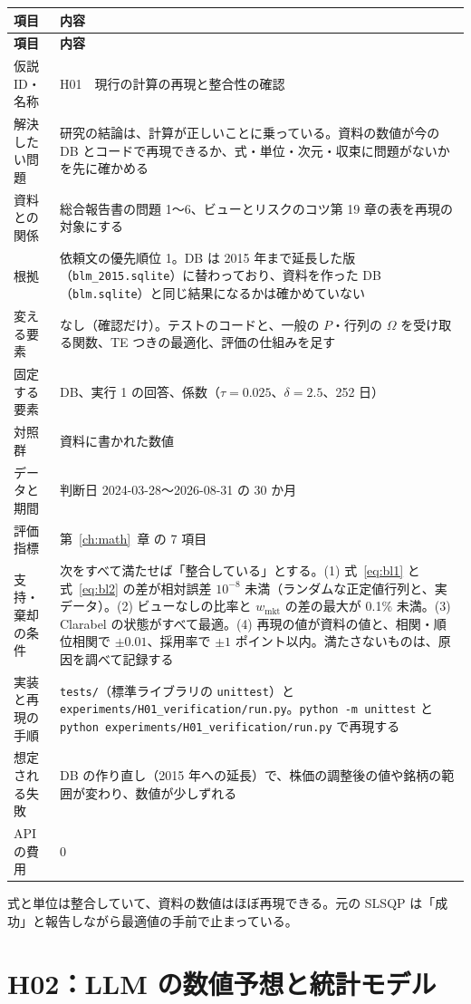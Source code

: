 \documentclass[xelatex,ja=standard,jafont=haranoaji,a4paper,10pt,openany]{bxjsreport}
\newcommand{\code}[1]{\texttt{#1}}
\newcommand{\wmkt}{w_{\mathrm{mkt}}}
\newcommand{\chapref}[1]{第~\ref{#1}~章}
\newenvironment{plan}{\small\begin{longtable}{p{3.3cm}p{11.6cm}}\toprule\textbf{項目} & \textbf{内容} \\\midrule\endfirsthead
\toprule\textbf{項目} & \textbf{内容} \\\midrule\endhead\bottomrule\endfoot}{\end{longtable}}
\begin{document}
\begin{plan}
仮説 ID・名称 & H01　現行の計算の再現と整合性の確認 \\
解決したい問題 & 研究の結論は、計算が正しいことに乗っている。資料の数値が今の DB とコードで再現できるか、式・単位・次元・収束に問題がないかを先に確かめる \\
資料との関係 & 総合報告書の問題 1〜6、ビューとリスクのコツ第 19 章の表を再現の対象にする \\
根拠 & 依頼文の優先順位 1。DB は 2015 年まで延長した版（\code{blm\_2015.sqlite}）に替わっており、資料を作った DB（\code{blm.sqlite}）と同じ結果になるかは確かめていない \\
変える要素 & なし（確認だけ）。テストのコードと、一般の $P$・行列の $\Omega$ を受け取る関数、TE つきの最適化、評価の仕組みを足す \\
固定する要素 & DB、実行 1 の回答、係数（$\tau=0.025$、$\delta=2.5$、252 日） \\
対照群 & 資料に書かれた数値 \\
データと期間 & 判断日 2024-03-28〜2026-08-31 の 30 か月 \\
評価指標 & \chapref{ch:math} の 7 項目 \\
支持・棄却の条件 & 次をすべて満たせば「整合している」とする。(1) 式~\eqref{eq:bl1} と式~\eqref{eq:bl2} の差が相対誤差 $10^{-8}$ 未満（ランダムな正定値行列と、実データ）。(2) ビューなしの比率と $\wmkt$ の差の最大が 0.1\% 未満。(3) Clarabel の状態がすべて最適。(4) 再現の値が資料の値と、相関・順位相関で $\pm0.01$、採用率で $\pm1$ ポイント以内。満たさないものは、原因を調べて記録する \\
実装と再現の手順 & \code{tests/}（標準ライブラリの \code{unittest}）と \code{experiments/H01\_verification/run.py}。\code{python -m unittest} と \code{python experiments/H01\_verification/run.py} で再現する \\
想定される失敗 & DB の作り直し（2015 年への延長）で、株価の調整後の値や銘柄の範囲が変わり、数値が少しずれる \\
API の費用 & 0 \\
\end{plan}

\begin{predbox}
式と単位は整合していて、資料の数値はほぼ再現できる。元の SLSQP は「成功」と報告しながら最適値の手前で止まっている。
\end{predbox}

\chapter{H02：LLM の数値予想と統計モデル}\label{ch:h02}
\end{document}
